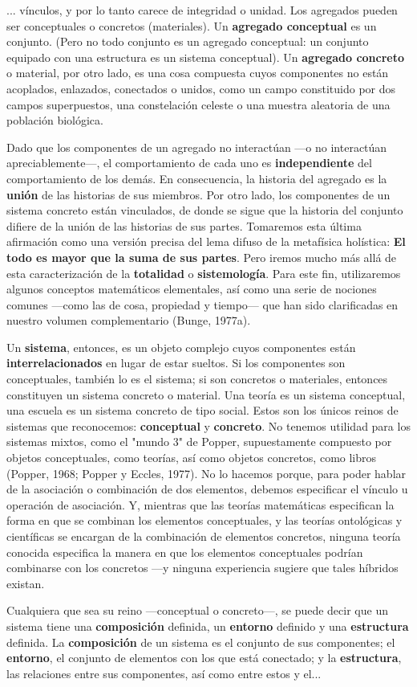 {\fontsize{13}{15}\selectfont
... vínculos, y por lo tanto carece de integridad o unidad. Los agregados pueden ser conceptuales o concretos (materiales). Un \textbf{agregado conceptual} es un conjunto. (Pero no todo conjunto es un agregado conceptual: un conjunto equipado con una estructura es un sistema conceptual). Un \textbf{agregado concreto} o material, por otro lado, es una cosa compuesta cuyos componentes no están acoplados, enlazados, conectados o unidos, como un campo constituido por dos campos superpuestos, una constelación celeste o una muestra aleatoria de una población biológica.

Dado que los componentes de un agregado no interactúan —o no interactúan apreciablemente—, el comportamiento de cada uno es \textbf{independiente} del comportamiento de los demás. En consecuencia, la historia del agregado es la \textbf{unión} de las historias de sus miembros. Por otro lado, los componentes de un sistema concreto están vinculados, de donde se sigue que la historia del conjunto difiere de la unión de las historias de sus partes. Tomaremos esta última afirmación como una versión precisa del lema difuso de la metafísica holística: \textbf{El todo es mayor que la suma de sus partes}. Pero iremos mucho más allá de esta caracterización de la \textbf{totalidad} o \textbf{sistemología}. Para este fin, utilizaremos algunos conceptos matemáticos elementales, así como una serie de nociones comunes —como las de cosa, propiedad y tiempo— que han sido clarificadas en nuestro volumen complementario (Bunge, 1977a).

Un \textbf{sistema}, entonces, es un objeto complejo cuyos componentes están \textbf{interrelacionados} en lugar de estar sueltos. Si los componentes son conceptuales, también lo es el sistema; si son concretos o materiales, entonces constituyen un sistema concreto o material. Una teoría es un sistema conceptual, una escuela es un sistema concreto de tipo social. Estos son los únicos reinos de sistemas que reconocemos: \textbf{conceptual} y \textbf{concreto}. No tenemos utilidad para los sistemas mixtos, como el "mundo 3" de Popper, supuestamente compuesto por objetos conceptuales, como teorías, así como objetos concretos, como libros (Popper, 1968; Popper y Eccles, 1977). No lo hacemos porque, para poder hablar de la asociación o combinación de dos elementos, debemos especificar el vínculo u operación de asociación. Y, mientras que las teorías matemáticas especifican la forma en que se combinan los elementos conceptuales, y las teorías ontológicas y científicas se encargan de la combinación de elementos concretos, ninguna teoría conocida especifica la manera en que los elementos conceptuales podrían combinarse con los concretos —y ninguna experiencia sugiere que tales híbridos existan.

Cualquiera que sea su reino —conceptual o concreto—, se puede decir que un sistema tiene una \textbf{composición} definida, un \textbf{entorno} definido y una \textbf{estructura} definida. La \textbf{composición} de un sistema es el conjunto de sus componentes; el \textbf{entorno}, el conjunto de elementos con los que está conectado; y la \textbf{estructura}, las relaciones entre sus componentes, así como entre estos y el...
}
\newpage
\fancyhf{}
\fancyhead[R]{\thepage} 

